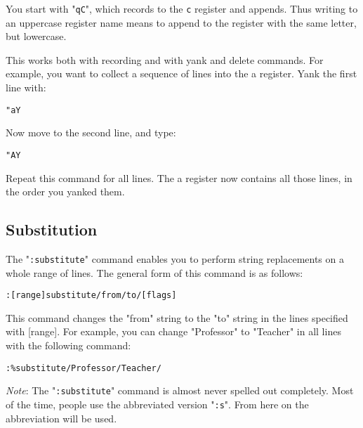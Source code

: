 You start with "\texttt{qC}", which records to the \texttt{c} register and appends.
Thus writing to an uppercase register name means to append to the register with the same letter, but lowercase.

This works both with recording and with yank and delete commands.
For example, you want to collect a sequence of lines into the a register.
Yank the first line with:

\begin{Verbatim}[samepage=true]
 "aY
\end{Verbatim}

Now move to the second line, and type:

\begin{Verbatim}[samepage=true]
 "AY
\end{Verbatim}

Repeat this command for all lines.
The a register now contains all those lines, in the order you yanked them.

\subsection{Substitution}
\label{find-replace}
The "\texttt{:substitute}" command enables you to perform string replacements on a whole range of lines.
The general form of this command is as follows:

\begin{Verbatim}[samepage=true]
 :[range]substitute/from/to/[flags]
\end{Verbatim}

This command changes the "from" string to the "to" string in the lines specified with [range].
For example, you can change "Professor" to "Teacher" in all lines with the following command:

\begin{Verbatim}[samepage=true]
 :%substitute/Professor/Teacher/
\end{Verbatim}
 
\emph{Note}: The "\texttt{:substitute}" command is almost never spelled out completely.
Most of the time, people use the abbreviated version "\texttt{:s}".
From here on the abbreviation will be used.

